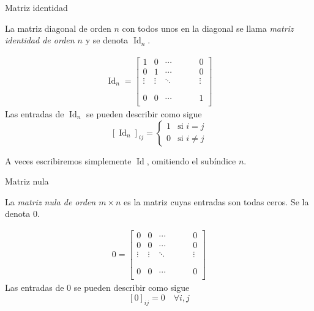 \documentclass[handout]{beamer} %
\newcommand\Id{\operatorname{Id}}
\renewcommand{\_}[1]{_{\left[ #1 \right]}}
\renewcommand{\^}[1]{^{\left[ #1 \right]}}
\begin{document}
\begin{frame}{Matriz identidad}
	
	La matriz diagonal de orden $n$ con todos unos en la diagonal se llama \textit{matriz identidad de orden $n$} y se denota \textit{$\Id_n$}.\pause
	
	
	\begin{align*}
		\Id_n=
		\left[
		\begin{array}{ccccccc}
			1 & 0 & \cdots & & &  & 0\\ 
			0 & 1 & \cdots & & &  & 0\\
			\vdots & \vdots & \ddots & & &  & \vdots\\
			& &  & & &  \\
			& &  & & &  \\
			0 & 0 & \cdots & & & & 1\\ 
		\end{array}
		\right]
	\end{align*}
	\pause
	Las entradas de $\Id_n$ se pueden describir como sigue 
	$$
	[\Id_n]_{ij}=\begin{cases}
		1&\mbox{si $i=j$}\\ 
		0&\mbox{si $i\neq j$}
	\end{cases}
	$$
	
	A veces escribiremos simplemente \textit{$\Id$}, omitiendo el sub\'indice $n$.
\end{frame}

\begin{frame}{Matriz nula}
	
	La \textit{matriz nula de orden $m\times n$} es la matriz cuyas entradas son todas ceros. Se la denota \textit{$0$}.
	\pause
	
	\begin{align*}
		0=
		\left[
		\begin{array}{ccccccc}
			0 & 0 & \cdots & & &  & 0\\ 
			0 & 0 & \cdots & & &  & 0\\
			\vdots & \vdots & \ddots & & &  & \vdots\\
			& &  & & &  \\
			& &  & & &  \\
			0 & 0 & \cdots & & & & 0\\ 
		\end{array}
		\right]
	\end{align*}
	\pause
	Las entradas de $0$ se pueden describir como sigue 
	$$
	[0]_{ij}=0\quad\forall i,j
	$$
\end{frame}
\end{document}
